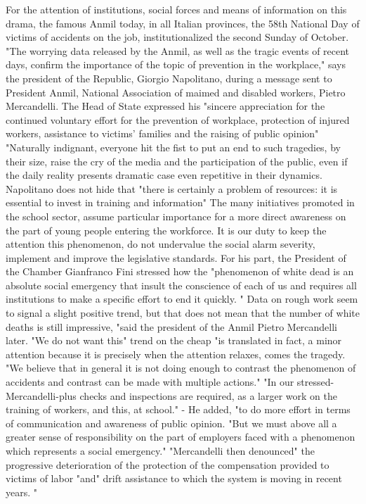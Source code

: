 For the attention of institutions, social forces and means of information on this drama, the famous Anmil today, in all Italian provinces, the 58th National Day of victims of accidents on the job, institutionalized the second Sunday of October.
"The worrying data released by the Anmil, as well as the tragic events of recent days, confirm the importance of the topic of prevention in the workplace," says the president of the Republic, Giorgio Napolitano, during a message sent to President Anmil, National Association of maimed and disabled workers, Pietro Mercandelli.
The Head of State expressed his "sincere appreciation for the continued voluntary effort for the prevention of workplace, protection of injured workers, assistance to victims' families and the raising of public opinion"
"Naturally indignant, everyone hit the fist to put an end to such tragedies, by their size, raise the cry of the media and the participation of the public, even if the daily reality presents dramatic case even repetitive in their dynamics.
Napolitano does not hide that "there is certainly a problem of resources: it is essential to invest in training and information"
The many initiatives promoted in the school sector, assume particular importance for a more direct awareness on the part of young people entering the workforce.
It is our duty to keep the attention this phenomenon, do not undervalue the social alarm severity, implement and improve the legislative standards.
For his part, the President of the Chamber Gianfranco Fini stressed how the "phenomenon of white dead is an absolute social emergency that insult the conscience of each of us and requires all institutions to make a specific effort to end it quickly. "
Data on rough work seem to signal a slight positive trend, but that does not mean that the number of white deaths is still impressive, "said the president of the Anmil Pietro Mercandelli later.
"We do not want this" trend on the cheap "is translated in fact, a minor attention because it is precisely when the attention relaxes, comes the tragedy.
"We believe that in general it is not doing enough to contrast the phenomenon of accidents and contrast can be made with multiple actions."
"In our stressed-Mercandelli-plus checks and inspections are required, as a larger work on the training of workers, and this, at school."
- He added, "to do more effort in terms of communication and awareness of public opinion.
"But we must above all a greater sense of responsibility on the part of employers faced with a phenomenon which represents a social emergency."
"Mercandelli then denounced" the progressive deterioration of the protection of the compensation provided to victims of labor "and" drift assistance to which the system is moving in recent years. "
